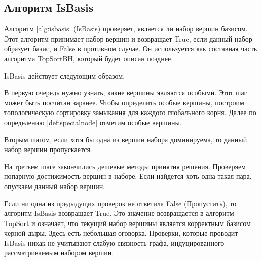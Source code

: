\documentclass[12pt,a4paper,oneside,openany]{article}
\theoremstyle{definition}
\theoremstyle{lemma}
\theoremstyle{remark}
\begin{document}
\subsection{Алгоритм IsBasis}\label{subsec:isbasis}

Алгоритм \ref{alg:isbasis} (IsBasis)  проверяет, является ли набор вершин базисом.
Этот алгоритм принимает набор вершин и возвращает True, если данный набор образует базис, и False в противном случае.
Он используется как составная часть алгоритма TopSortBH, который будет описан позднее.

IsBasis действует следующим образом.

В первую очередь нужно узнать, какие вершины являются особыми.
Этот шаг может быть посчитан заранее. Чтобы определить особые вершины,
построим топологическую сортировку замыкания для каждого глобального корня.
Далее по определению \ref{def:specialnode} отметим особые вершины.

Вторым шагом, если хотя бы одна из вершин набора доминируема, то данный набор вершин пропускается.

На третьем шаге закончились дешевые методы принятия решения.
Проверяем попарную достижимость вершин в наборе.
Если найдется хоть одна такая пара, опускаем данный набор вершин.

Если ни одна из предыдущих проверок не ответила False (Пропустить), то алгоритм IsBasis возвращает True.
Это значение возвращается в алгоритм TopSort и означает, что текущий набор вершины является корректным базисом черной дыры.
Здесь есть небольшая оговорка. Проверки, которые проводит IsBasis никак не учитывают слабую связность
графа, индуцированного рассматриваемым набором вершин.
\end{document}
